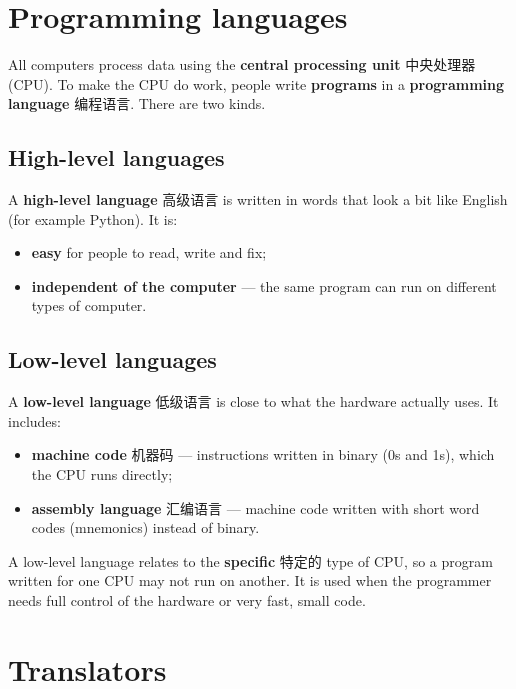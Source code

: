 \documentclass[11pt]{article}
\begin{document}
\section*{Programming languages}

All computers process data using the \textbf{central processing unit} 中央处理器 (CPU). To make the CPU do work, people write \textbf{programs} in a \textbf{programming language} 编程语言. There are two kinds.

\subsection*{High-level languages}

A \textbf{high-level language} 高级语言 is written in words that look a bit like English (for example Python). It is:

\begin{itemize}
\item \textbf{easy} for people to read, write and fix;

\item \textbf{independent of the computer} — the same program can run on different types of computer.

\end{itemize}

\subsection*{Low-level languages}

A \textbf{low-level language} 低级语言 is close to what the hardware actually uses. It includes:

\begin{itemize}
\item \textbf{machine code} 机器码 — instructions written in binary (0s and 1s), which the CPU runs directly;

\item \textbf{assembly language} 汇编语言 — machine code written with short word codes (mnemonics) instead of binary.

\end{itemize}

A low-level language relates to the \textbf{specific} 特定的 type of CPU, so a program written for one CPU may not run on another. It is used when the programmer needs full control of the hardware or very fast, small code.

\section*{Translators}
\end{document}
